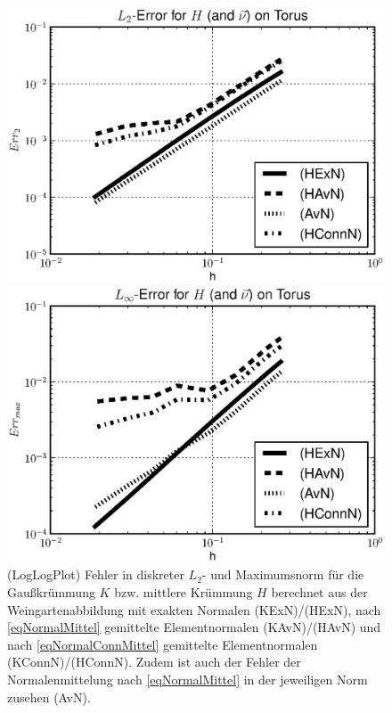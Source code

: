 \begin{beispiel}[Torus]
\begin{figure}
\begin{minipage}[t]{0.49\textwidth}
        \end{minipage}\\
        \begin{minipage}[t]{0.49\textwidth}
          \centering\includegraphics[width=\textwidth]{bilder/Curvature/TorusHWein2Plot.eps}
        \end{minipage}\hfill
        \begin{minipage}[t]{0.49\textwidth}
          \centering\includegraphics[width=\textwidth]{bilder/Curvature/TorusHWeinMaxPlot.eps}
        \end{minipage}
        \caption[Fehler Gauß-/mittlere Krümmung aus Weingartenabb. auf Torus]
                {(LogLogPlot) Fehler in diskreter \( L_{2} \)- und Maximumsnorm für die Gaußkrümmung \( K \) bzw. mittlere Krümmung \( H \) berechnet aus
                der Weingartenabbildung mit exakten Normalen (KExN)/(HExN), 
                nach \eqref{eqNormalMittel} gemittelte Elementnormalen (KAvN)/(HAvN) 
                und nach \eqref{eqNormalConnMittel} gemittelte Elementnormalen (KConnN)/(HConnN).
                Zudem ist auch der Fehler der Normalenmittelung nach \eqref{eqNormalMittel} in der jeweiligen Norm zusehen (AvN).}
        \label{figWeingartenFehlerTorus}
      \end{figure}
    \end{beispiel}

